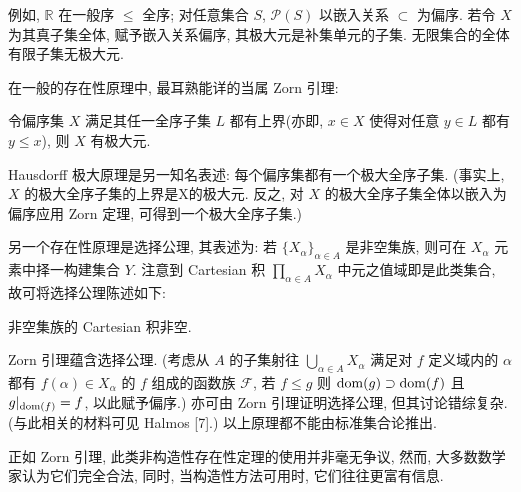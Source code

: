 例如, $\mathbb R$ 在一般序 $\leqslant $ 全序; 对任意集合 $S$, $\mathcal P(S)$ 以嵌入关系 $\subset$ 为偏序. 若令 $X$ 为其真子集全体, 赋予嵌入关系偏序, 其极大元是补集单元的子集. 无限集合的全体有限子集无极大元.

在一般的存在性原理中, 最耳熟能详的当属 Zorn 引理:
\begin{theorem}[Zorn 引理]
    令偏序集 $X$ 满足其任一全序子集 $L$ 都有上界(亦即, $x\in X$ 使得对任意 $y\in L$ 都有 $y\leqslant x$), 则 $X$ 有极大元.
\end{theorem}
Hausdorff 极大原理是另一知名表述: 每个偏序集都有一个极大全序子集. (事实上, $X$ 的极大全序子集的上界是X的极大元. 反之, 对 $X$ 的极大全序子集全体以嵌入为偏序应用 Zorn 定理, 可得到一个极大全序子集.)

另一个存在性原理是选择公理, 其表述为: 若 $\{X_\alpha\}_{\alpha\in A}$ 是非空集族, 则可在 $X_\alpha$ 元素中择一构建集合 $Y$. 注意到 Cartesian 积 $\prod_{\alpha\in A}X_\alpha$ 中元之值域即是此类集合, 故可将选择公理陈述如下:
\begin{theorem}[选择公理]
    非空集族的 Cartesian 积非空.
\end{theorem}
Zorn 引理蕴含选择公理. (考虑从 $A$ 的子集射往 $\bigcup_{\alpha\in A}X_\alpha$ 满足对 $f$ 定义域内的 $\alpha$ 都有 $f(\alpha)\in X_\alpha$ 的 $f$ 组成的函数族 $\mathcal F$, 若 $f\leqslant g$ 则 $\operatorname{dom}(g)\supset\operatorname{dom}(f)$ 且 $g|_{\operatorname{dom}(f)}=f$, 以此赋予偏序.) 亦可由 Zorn 引理证明选择公理, 但其讨论错综复杂. (与此相关的材料可见 Halmos [7].) 以上原理都不能由标准集合论推出.

正如 Zorn 引理, 此类非构造性存在性定理的使用并非毫无争议, 然而, 大多数数学家认为它们完全合法, 同时, 当构造性方法可用时, 它们往往更富有信息.